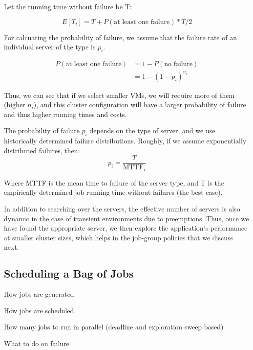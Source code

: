 Let the running time without failure be T:

\begin{equation}
  \label{eq:et1}
E[T_i] = T + P(\text{at least one failure})*T/2   
\end{equation}

For calcuating the probability of failure, we assume that the failure rate of an individual server of the type is $p_i$. 

\begin{align}
  \label{eq:pfail1}
  P(\text{at least one failure}) &= 1-P(\text{no failure}) \\
                                 &= 1-(1-p_i)^{n_i} 
\end{align}

Thus, we can see that if we select smaller VMs, we will require more of them (higher $n_i$), and this cluster configuration will have a larger probability of failure and thus higher running times and costs.

The probability of failure $p_i$ depends on the type of server, and we use historically determined failure distributions.
Roughly, if we assume exponentially distributed failures, then:
\begin{equation}
  \label{eq:pi}
  p_i = \dfrac{T}{\text{MTTF}_i}
\end{equation}

Where MTTF is the mean time to failure of the server type, and T is the empirically determined job running time without failures (the best case).





In addition to searching over the servers, the effective number of servers is also dynamic in the case of transient environments due to preemptions.
Thus, once we have found the appropriate server, we then explore the application's performance at smaller cluster sizes, which helps in the job-group policies that we discuss next. 

\subsection{Scheduling a Bag of Jobs}

How jobs are generated 

How jobs are scheduled.

How many jobs to run in parallel (deadline and exploration sweep based)

What to do on failure



